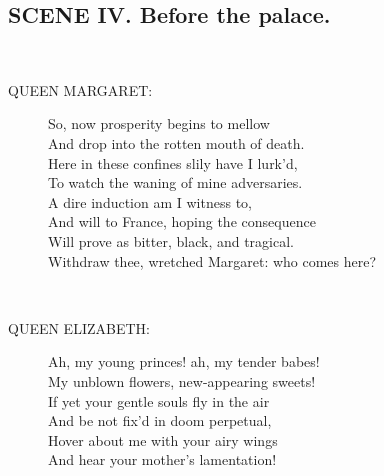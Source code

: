 \documentclass{article}
\begin{document}
\subsection*{SCENE IV.  Before the palace.}
\\
\begin{description}
\item[QUEEN MARGARET:] 
\hspace{1pt}So, now prosperity begins to mellow\\
\hspace{1pt}And drop into the rotten mouth of death.\\
\hspace{1pt}Here in these confines slily have I lurk'd,\\
\hspace{1pt}To watch the waning of mine adversaries.\\
\hspace{1pt}A dire induction am I witness to,\\
\hspace{1pt}And will to France, hoping the consequence\\
\hspace{1pt}Will prove as bitter, black, and tragical.\\
\hspace{1pt}Withdraw thee, wretched Margaret: who comes here?\\
\end{description}
\\
\begin{description}
\item[QUEEN ELIZABETH:] 
\hspace{1pt}Ah, my young princes! ah, my tender babes!\\
\hspace{1pt}My unblown flowers, new-appearing sweets!\\
\hspace{1pt}If yet your gentle souls fly in the air\\
\hspace{1pt}And be not fix'd in doom perpetual,\\
\hspace{1pt}Hover about me with your airy wings\\
\hspace{1pt}And hear your mother's lamentation!\\
\end{description}
\end{document}
